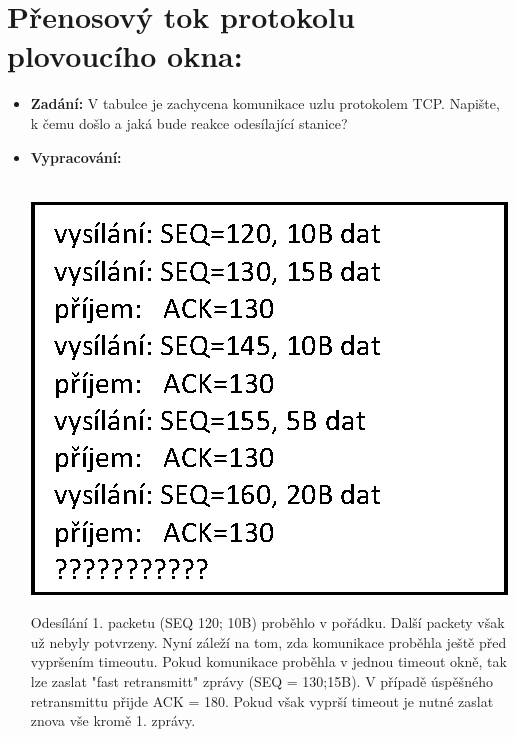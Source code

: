 \documentclass[10pt, a4paper]{article}%
\begin{document}
\section*{\large{\textbf{Přenosový tok protokolu plovoucího okna:}}}
	\begin{itemize}[label={}]

		\item \textbf{Zadání:}
			V tabulce je zachycena komunikace uzlu protokolem TCP. Napište, k čemu došlo a jaká bude reakce
			odesílající stanice?
		
		\item \textbf{Vypracování:}\\\\
		\begin{minipage}{0.4\textwidth}
			\includegraphics{TCP_table.eps}
		\end{minipage}
		\begin{minipage}{0.58\textwidth}
			\vspace{-2.2cm}
			Odesílání 1. packetu (SEQ 120; 10B) proběhlo v pořádku. Další packety však už
			nebyly potvrzeny. Nyní záleží na tom, zda komunikace proběhla ještě před vypršením timeoutu.
			Pokud komunikace proběhla v jednou timeout okně, tak lze zaslat "fast retransmitt" zprávy (SEQ = 130;15B).
			V případě úspěšného retransmittu přijde ACK = 180. Pokud však vyprší timeout je nutné
			zaslat znova vše kromě 1. zprávy.

		\end{minipage}
	\end{itemize}
	\clearpage
\end{document}
